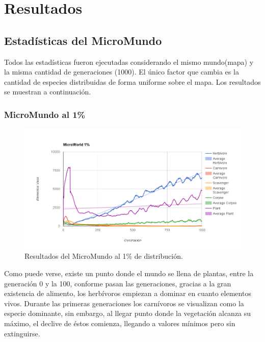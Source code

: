 \chapter{Resultados}
  \section{Estadísticas del MicroMundo}
    Todos las estadísticas fueron ejecutadas considerando el mismo mundo(mapa) y la misma cantidad de generaciones (1000). El único factor que cambia es la cantidad de especies distribuidas de forma uniforme sobre el mapa. Los resultados se muestran a continuación.
    \subsection{MicroMundo al 1\%}      
      \begin{figure}[h!]
        \centering
          \includegraphics[width=\textwidth]{./images/0_01.png}
          \caption{Resultados del MicroMundo al 1\% de distribución.} 
      \end{figure}      
      Como puede verse, existe un punto donde el mundo se llena de plantas, entre la generación 0 y la 100, conforme pasan las generaciones, gracias a la gran existencia de alimento, los herbívoros empiezan a dominar en cuanto elementos vivos. Durante las primeras generaciones los carnívoros se visualizan como la especie dominante, sin embargo, al llegar punto donde la vegetación alcanza su máximo, el declive de éstos comienza, llegando a valores mínimos pero sin extinguirse.
